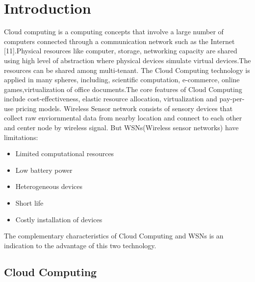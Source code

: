 \documentclass {report}
\begin{document}
\chapter {Introduction}
Cloud computing is a computing concepts that involve a large number of computers connected through a communication network such as the Internet [11].Physical resources like computer, storage, networking capacity are shared using high level of abstraction where physical devices simulate virtual devices.The resources can be shared among multi-tenant.
The Cloud Computing technology is applied in many spheres, including, scientific computation, e-commerce, online games,virtualization of office documents.The core 
features of Cloud Computing  include cost-effectiveness, elastic resource allocation, 
virtualization and pay-per-use pricing models.
Wireless Sensor network consists of  sensory devices that collect raw enviornmental data from nearby location and connect to each other and center node by wireless signal. But WSNs(Wireless sensor networks) have limitations: 
\begin{itemize}
\item  Limited computational resources 
\item Low battery power
\item Heterogeneous  devices
\item Short life
\item Costly installation of devices
\end{itemize}
The complementary characteristics of Cloud Computing and WSNs is an indication to the advantage of this two technology.\\


\section{Cloud Computing}
\end{document}
